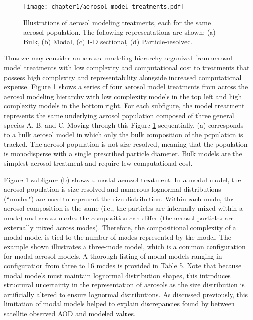 \begin{figure}[!t]
	\centering
	\texttt{[image: chapter1/aerosol-model-treatments.pdf]}
	\caption{Illustrations of aerosol modeling treatments, each for the same aerosol population. The following representations are shown: (a) Bulk, (b) Modal, (c) 1-D sectional, (d) Particle-resolved.}
	\label{fig:aerosol-models}
\end{figure}

Thus we may consider an aerosol modeling hierarchy organized from aerosol model treatments with low complexity and computational cost to treatments that possess high complexity and representability alongside increased computational expense. Figure \ref{fig:aerosol-models} shows a series of four aerosol model treatments from across the aerosol modeling hierarchy with low complexity models in the top left and high complexity models in the bottom right. For each subfigure, the model treatment represents the same underlying aerosol population composed of three general species A, B, and C. Moving through this Figure \ref{fig:aerosol-models} sequentially, (a) corresponds to a bulk aerosol model in which only the bulk composition of the population is tracked. The aerosol population is not size-resolved, meaning that the population is monodisperse with a single prescribed particle diameter. Bulk models are the simplest aerosol treatment and require low computational cost. 

Figure \ref{fig:aerosol-models} subfigure (b) shows a modal aerosol treatment. In a modal model, the aerosol population is size-resolved and numerous lognormal distributions (``modes") are used to represent the size distribution. Within each mode, the aerosol composition is the same (i.e., the particles are internally mixed within a mode) and across modes the composition can differ (the aerosol particles are externally mixed across modes). Therefore, the compositional complexity of a modal model is tied to the number of modes represented by the model. The example shown illustrates a three-mode model, which is a common configuration for modal aerosol models. A thorough listing of modal models ranging in configuration from three to 16 modes is provided in \textcite{riemer_aerosol_2019} Table 5. Note that because modal models must maintain lognormal distribution shapes, this introduces structural uncertainty in the representation of aerosols as the size distribution is artificially altered to ensure lognormal distributions. As discussed previously, this limitation of modal models helped to explain discrepancies found by \textcite{crippa_impact_2017} between satellite observed AOD and modeled values.  

